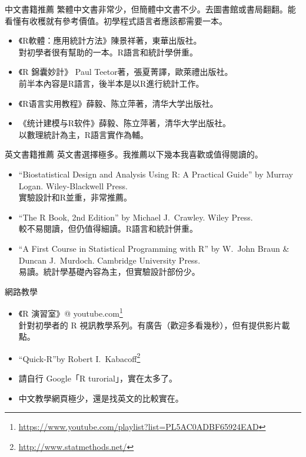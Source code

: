 \documentclass[14pt, aspectratio=43]{beamer}
\let\oldfootnote\footnote
\renewcommand\footnote[1]{\hspace{-0.7em}\oldfootnote{\ignorespaces#1}\hspace{0.5em}}
\begin{document}
\begin{frame}{中文書籍推薦}
繁體中文書非常少，但簡體中文書不少。去圖書館或書局翻翻。能看懂有收穫就有參考價值。初學程式語言者應該都需要一本。
\begin{itemize}
\item 《R軟體：應用統計方法》陳景祥著，東華出版社。\\ 對初學者很有幫助的一本。R語言和統計學併重。
\item 《R 錦囊妙計》 Paul Teetor著，張夏菁譯，歐萊禮出版社。\\ 前半本內容是R語言，後半本是以R進行統計工作。
\item {《R语言实用教程》薛毅、陈立萍著，清华大学出版社。}
\item {《统计建模与R软件》薛毅、陈立萍著，清华大学出版社。} \\ 以數理統計為主，R語言實作為輔。
\end{itemize}
\end{frame}

\begin{frame}{英文書籍推薦}
英文書選擇極多。我推薦以下幾本我喜歡或值得閱讀的。
\begin{itemize}
\item ``Biostatistical Design and Analysis Using R: A Practical Guide'' by Murray Logan. Wiley-Blackwell Press.\\ 實驗設計和R並重，非常推薦。
\item ``The R Book, 2nd Edition'' by Michael J.~Crawley. Wiley Press. \\ 較不易閱讀，但仍值得細讀。R語言和統計併重。
\item ``A First Course in Statistical Programming with R'' by W.~John Braun \& Duncan J.~Murdoch. Cambridge University Press. \\ 易讀。統計學基礎內容為主，但實驗設計部份少。
\end{itemize}
\end{frame}


\begin{frame}{網路教學}
\begin{itemize}
\item 《R 演習室》\makeatletter @ \makeatother youtube.com\oldfootnote{\url{https://www.youtube.com/playlist?list=PL5AC0ADBF65924EAD}} \\ 針對初學者的 R 視訊教學系列。有廣告（歡迎多看幾秒），但有提供影片載點。
\item ``Quick-R''by Robert I.~Kabacoff\oldfootnote{\url{http://www.statmethods.net/}}
\item 請自行 Google「R turorial」，實在太多了。
\item 中文教學網頁極少，還是找英文的比較實在。
\end{itemize}
\end{frame}
\end{document}

